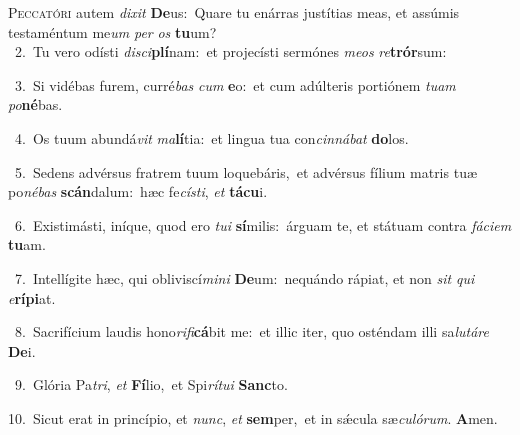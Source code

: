 \lettrine{\initial\textcolor{\initialcolor}{P}}{eccatóri} autem \textit{di}\-\textit{xit} \textbf{De}\-us:~\star Quare tu enárras justítias meas, et assúmis testaméntum me\textit{um} \textit{per} \textit{os} \textbf{tu}\-um?\\
{\numbfont\textcolor{\numbcolor}{~2.}}~Tu vero odísti \textit{di}\-\textit{sci}\textbf{plí}nam:~\star et projecísti sermónes \textit{me}\-\textit{os} \textit{re}\-\textbf{trór}sum:\par
{\numbfont\textcolor{\numbcolor}{~3.}}~Si vidébas furem, curré\textit{bas} \textit{cum} \textbf{e}\-o:~\star et cum adúlteris portiónem \textit{tu}\-\textit{am} \textit{po}\-\textbf{né}bas.\par
{\numbfont\textcolor{\numbcolor}{~4.}}~Os tuum abundá\textit{vit} \textit{ma}\-\textbf{lí}tia:~\star et lingua tua con\-\textit{cin}\-\textit{ná}\textit{bat} \textbf{do}\-los.\par
{\numbfont\textcolor{\numbcolor}{~5.}}~Sedens advérsus fratrem tuum loquebáris,~\dagger et advérsus fílium matris tuæ po\-\textit{né}\-\textit{bas} \textbf{scán}\-dalum:~\star hæc fe\-\textit{cís}\-\textit{ti}, \textit{et} \textbf{tá}\-\textbf{cu}i.\par
{\numbfont\textcolor{\numbcolor}{~6.}}~Existimásti, iníque, quod ero \textit{tu}\-\textit{i} \textbf{sí}\-milis:~\star árguam te, et státuam contra \textit{fá}\-\textit{ci}\textit{em} \textbf{tu}\-am.\par
{\numbfont\textcolor{\numbcolor}{~7.}}~Intellígite hæc, qui obliviscí\-\textit{mi}\-\textit{ni} \textbf{De}\-um:~\star nequándo rápiat, et non \textit{sit} \textit{qui} \textit{e}\-\textbf{rí}\textbf{pi}at.\par
{\numbfont\textcolor{\numbcolor}{~8.}}~Sacrifícium laudis hono\-\textit{ri}\-\textit{fi}\textbf{cá}bit me:~\star et illic iter, quo osténdam illi sa\-\textit{lu}\-\textit{tá}\textit{re} \textbf{De}\-i.\par
{\numbfont\textcolor{\numbcolor}{~9.}}~Glória Pa\-\textit{tri}\-, \textit{et} \textbf{Fí}\-lio,~\star et Spi\-\textit{rí}\-\textit{tu}\textit{i} \textbf{Sanc}\-to.\par
{\numbfont\textcolor{\numbcolor}{10.}}~Sicut erat in princípio, et \textit{nunc}\-, \textit{et} \textbf{sem}\-per,~\star et in sǽcula sæ\-\textit{cu}\-\textit{ló}\textit{rum}. \textbf{A}\-men.\par
